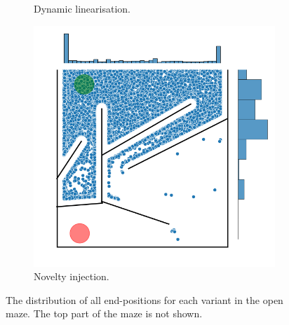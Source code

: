 \begin{figure}[H]
\begin{mdframed}
\begin{subfigure}[b]{0.5\textwidth}
            \caption{Dynamic linearisation.}
        \end{subfigure}
        \begin{subfigure}[b]{0.5\textwidth}
            \includegraphics[scale=0.4]{resources/mazes/novelty_injection_open_all_runs.png}
            \caption{Novelty injection.}
        \end{subfigure}
    \end{mdframed}
    \caption{The distribution of all end-positions for each variant in the open maze.
             The top part of the maze is not shown.}
    \label{distribution_open}
\end{figure}


